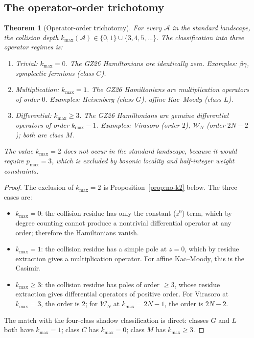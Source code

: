 \documentclass[11pt]{article}
\theoremstyle{plain}
\newtheorem{theorem}{Theorem}[section]
\theoremstyle{definition}
\theoremstyle{remark}
\newcommand{\cA}{\mathcal{A}}
\newcommand{\Walg}{\mathcal{W}}
\begin{document}
\subsection{The operator-order trichotomy}

\begin{theorem}[Operator-order trichotomy]\label{thm:op-trichotomy}
For every $\cA$ in the standard landscape, the collision depth
$k_{\max}(\cA)\in\{0,1\}\cup\{3,4,5,\ldots\}$. The classification
into three operator regimes is:
\begin{enumerate}[label=\textup{(\roman*)}]
 \item \emph{Trivial}\/: $k_{\max}=0$. The GZ26 Hamiltonians are
 identically zero. Examples: $\beta\gamma$, symplectic
 fermions (class $C$).
 \item \emph{Multiplication}\/: $k_{\max}=1$. The GZ26
 Hamiltonians are multiplication operators of order $0$.
 Examples: Heisenberg (class $G$), affine Kac--Moody (class $L$).
 \item \emph{Differential}\/: $k_{\max}\geq 3$. The GZ26
 Hamiltonians are genuine differential operators of order
 $k_{\max}-1$. Examples: Virasoro (order $2$),
 $\Walg_N$ (order $2N-2$); both are class $M$.
\end{enumerate}
The value $k_{\max}=2$ does not occur in the standard landscape,
because it would require $p_{\max}=3$, which is excluded by
bosonic locality and half-integer weight constraints.
\end{theorem}

\begin{proof}
The exclusion of $k_{\max}=2$ is Proposition~\ref{prop:no-k2}
below. The three cases are:
\begin{itemize}
 \item $k_{\max}=0$: the collision residue has only the
 constant ($z^0$) term, which by degree counting cannot produce
 a nontrivial differential operator at any order; therefore
 the Hamiltonians vanish.
 \item $k_{\max}=1$: the collision residue has a simple pole
 at $z=0$, which by residue extraction gives a multiplication
 operator. For affine Kac--Moody, this is the Casimir.
 \item $k_{\max}\geq 3$: the collision residue has poles of
 order $\geq 3$, whose residue extraction gives differential
 operators of positive order. For Virasoro at $k_{\max}=3$,
 the order is $2$; for $\Walg_N$ at $k_{\max}=2N-1$, the order
 is $2N-2$.
\end{itemize}
The match with the four-class shadow classification is direct:
classes $G$ and $L$ both have $k_{\max}=1$; class $C$ has
$k_{\max}=0$; class $M$ has $k_{\max}\geq 3$.
\end{proof}
\end{document}
